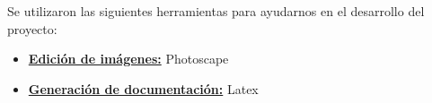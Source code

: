 Se utilizaron las siguientes herramientas para ayudarnos en el desarrollo del
proyecto:
\begin{itemize}
    \item \underline{\textbf{Edición de imágenes:}} Photoscape
    \item \underline{\textbf{Generación de documentación:}} Latex
\end{itemize}